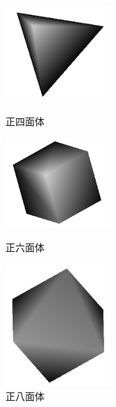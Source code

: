 \documentclass[]{jsarticle}
\begin{document}
\begin{figure}[htbp]
\begin{center}
\begin{minipage}[b]{0.45\textwidth}
  \begin{center}
    \includegraphics[width=4cm,keepaspectratio]{seisimentai.png}
    \caption{正四面体}
    \label{fig:seisimentai}
  \end{center}
\end{minipage}
\begin{minipage}[b]{0.45\textwidth}
  \begin{center}
    \includegraphics[width=4cm,keepaspectratio]{seirokumentai.png}
    \caption{正六面体}
    \label{fig:seirokumentai}
  \end{center}
\end{minipage}
\begin{minipage}[b]{0.45\textwidth}
  \begin{center}
    \includegraphics[width=4cm,keepaspectratio]{seihatimentai.png}
    \caption{正八面体}
    \label{fig:seihatimentai}
  \end{center}
\end{minipage}
\end{center}
\end{figure}
\end{document}
